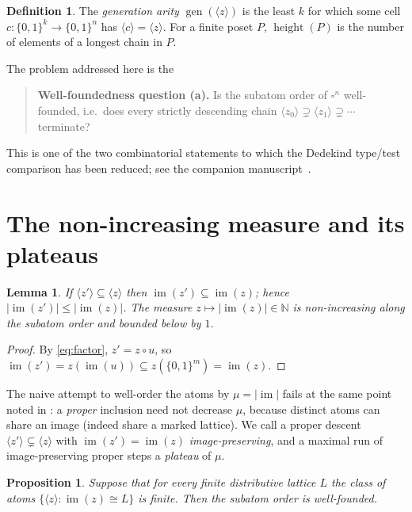 \documentclass[11pt]{amsart}
\theoremstyle{plain}
\newtheorem{lem}[thm]{Lemma}
\newtheorem{prop}[thm]{Proposition}
\theoremstyle{definition}
\newtheorem{defn}[thm]{Definition}
\newcommand{\B}{\{0,1\}}
\newcommand{\im}{\operatorname{im}}
\newcommand{\hgt}{\operatorname{height}}
\newcommand{\gen}{\operatorname{gen}}
\newcommand{\cube}{\square}
\newcommand{\atom}[1]{\langle #1 \rangle}
\begin{document}
\begin{defn}
  The \emph{generation arity} $\gen(\atom{z})$ is the least $k$ for
  which some cell $c\colon\B^{k}\to\B^{n}$ has $\atom{c}=\atom{z}$.
  For a finite poset $P$, $\hgt(P)$ is the number of elements of a
  longest chain in $P$.
\end{defn}

The problem addressed here is the

\begin{quote}
  \textbf{Well-foundedness question (a).} Is the subatom order of
  $\cube^{n}$ well-founded, i.e.\ does every strictly descending chain
  $\atom{z_{0}}\supsetneq\atom{z_{1}}\supsetneq\cdots$ terminate?
\end{quote}

This is one of the two combinatorial statements to which the Dedekind
type/test comparison has been reduced; see the companion
manuscript~\cite{PaperW}.

\section{The non-increasing measure and its plateaus}

\begin{lem}\label{lem:mono}
  If $\atom{z'}\subseteq\atom{z}$ then $\im(z')\subseteq\im(z)$; hence
  $|\im(z')|\le|\im(z)|$.  The measure $z\mapsto|\im(z)|\in\mathbb N$
  is non-increasing along the subatom order and bounded below by $1$.
\end{lem}

\begin{proof}
  By \eqref{eq:factor}, $z'=z\circ u$, so $\im(z')=z(\im(u))\subseteq
  z(\B^{m})=\im(z)$.
\end{proof}

The naive attempt to well-order the atoms by $\mu=|\im|$ fails at the
same point noted in \cite{PaperW}: a \emph{proper} inclusion need not
decrease $\mu$, because distinct atoms can share an image (indeed
share a marked lattice).  We call a proper descent
$\atom{z'}\subsetneq\atom{z}$ with $\im(z')=\im(z)$
\emph{image-preserving}, and a maximal run of image-preserving proper
steps a \emph{plateau} of $\mu$.

\begin{prop}\label{prop:reduce}
  Suppose that for every finite distributive lattice $L$ the class of
  atoms $\{\atom{z}:\im(z)\cong L\}$ is finite.  Then the subatom order
  is well-founded.
\end{prop}
\end{document}
